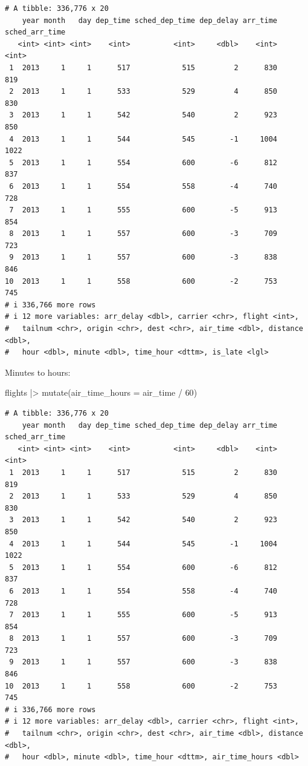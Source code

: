 \documentclass[
  letterpaper,
  DIV=11,
  numbers=noendperiod]{scrreprt}
\newenvironment{Shaded}{\begin{snugshade}}{\end{snugshade}}
\newcommand{\AttributeTok}[1]{\textcolor[rgb]{0.40,0.45,0.13}{#1}}
\newcommand{\DecValTok}[1]{\textcolor[rgb]{0.68,0.00,0.00}{#1}}
\newcommand{\FunctionTok}[1]{\textcolor[rgb]{0.28,0.35,0.67}{#1}}
\newcommand{\NormalTok}[1]{\textcolor[rgb]{0.00,0.23,0.31}{#1}}
\newcommand{\SpecialCharTok}[1]{\textcolor[rgb]{0.37,0.37,0.37}{#1}}
\begin{document}
\begin{verbatim}
# A tibble: 336,776 x 20
    year month   day dep_time sched_dep_time dep_delay arr_time sched_arr_time
   <int> <int> <int>    <int>          <int>     <dbl>    <int>          <int>
 1  2013     1     1      517            515         2      830            819
 2  2013     1     1      533            529         4      850            830
 3  2013     1     1      542            540         2      923            850
 4  2013     1     1      544            545        -1     1004           1022
 5  2013     1     1      554            600        -6      812            837
 6  2013     1     1      554            558        -4      740            728
 7  2013     1     1      555            600        -5      913            854
 8  2013     1     1      557            600        -3      709            723
 9  2013     1     1      557            600        -3      838            846
10  2013     1     1      558            600        -2      753            745
# i 336,766 more rows
# i 12 more variables: arr_delay <dbl>, carrier <chr>, flight <int>,
#   tailnum <chr>, origin <chr>, dest <chr>, air_time <dbl>, distance <dbl>,
#   hour <dbl>, minute <dbl>, time_hour <dttm>, is_late <lgl>
\end{verbatim}

Minutes to hours:

\begin{Shaded}
\begin{Highlighting}[]
\NormalTok{flights }\SpecialCharTok{|\textgreater{}}
  \FunctionTok{mutate}\NormalTok{(}\AttributeTok{air\_time\_hours =}\NormalTok{ air\_time }\SpecialCharTok{/} \DecValTok{60}\NormalTok{)}
\end{Highlighting}
\end{Shaded}

\begin{verbatim}
# A tibble: 336,776 x 20
    year month   day dep_time sched_dep_time dep_delay arr_time sched_arr_time
   <int> <int> <int>    <int>          <int>     <dbl>    <int>          <int>
 1  2013     1     1      517            515         2      830            819
 2  2013     1     1      533            529         4      850            830
 3  2013     1     1      542            540         2      923            850
 4  2013     1     1      544            545        -1     1004           1022
 5  2013     1     1      554            600        -6      812            837
 6  2013     1     1      554            558        -4      740            728
 7  2013     1     1      555            600        -5      913            854
 8  2013     1     1      557            600        -3      709            723
 9  2013     1     1      557            600        -3      838            846
10  2013     1     1      558            600        -2      753            745
# i 336,766 more rows
# i 12 more variables: arr_delay <dbl>, carrier <chr>, flight <int>,
#   tailnum <chr>, origin <chr>, dest <chr>, air_time <dbl>, distance <dbl>,
#   hour <dbl>, minute <dbl>, time_hour <dttm>, air_time_hours <dbl>
\end{verbatim}
\end{document}
